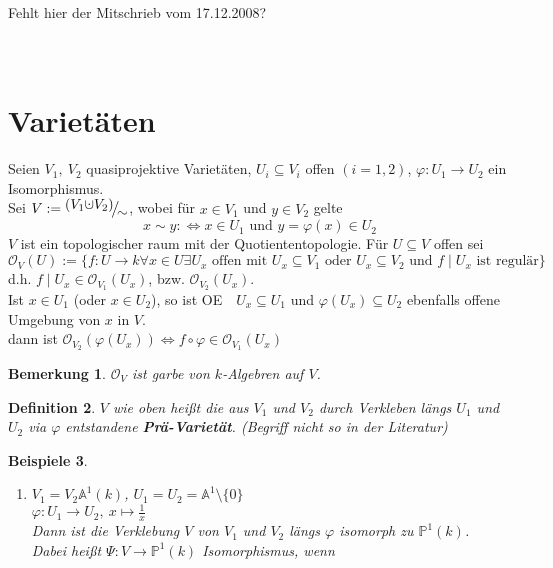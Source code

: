 \documentclass[a4paper,12pt]{report}
\theoremstyle{break}
\newtheorem{Def}{Definition}[section]
\newtheorem{Bem}[Def]{Bemerkung}
\newtheorem{Bsp}[Def]{Beispiele}
\theoremstyle{nonumberbreak}
\theoremstyle{nonumberplain}
\newcommand{\emp}[1]{\textbf{\emph{#1}}}
\newcommand{\begriff}[1]{{\index{#1}}\emp{#1}}
\newcommand{\cupdot}{\ensuremath{\mathaccent\cdot\cup}}
\newcommand{\FakRaum}[2]{
  \raisebox{0.7ex}{\ensuremath{#1}}
  \ensuremath{\mkern-3mu}\big/\ensuremath{\mkern-3mu}
  \raisebox{-0.6ex}{\ensuremath{#2}}}
\renewcommand{\OE}{O\!\!E}
\begin{document}
\\
\\
\\
\\
\Large{Fehlt hier der Mitschrieb vom 17.12.2008?}
\\
\\
\\
\section{Varietäten}

Seien $V_1,~V_2$ quasiprojektive Varietäten, $U_i\subseteq V_i$ offen $(i=1,2)$, $\varphi: U_1 \rightarrow U_2$ ein Isomorphismus.\\
Sei $V:=\FakRaum{(V_1\cupdot V_2)}{\sim}$, wobei für $x\in V_1$ und $y\in V_2$ gelte 
$$x\sim y :\Leftrightarrow x\in U_1 \text{ und } y=\varphi(x)\in U_2$$
$V$ ist ein topologischer raum mit der Quotiententopologie.
Für $U\subseteq V$ offen sei
$$\mathcal{O}_V(U):=\{f: U\rightarrow k \forall x\in U \exists U_x \text{ offen mit } U_x\subseteq V_1 \text{ oder } U_x\subseteq V_2 \text{ und } f\mid U_x \text{ ist regulär}\}$$
d.h. $f\mid U_x\in\mathcal{O}_{V_1}(U_x)$, bzw. $\mathcal{O}_{V_2}(U_x)$.\\
Ist $x\in U_1$ (oder $x\in U_2$), so ist \OE~~$U_x\subseteq U_1$ und $\varphi(U_x)\subseteq U_2$ ebenfalls offene Umgebung von $x$ in $V$.\\
dann ist $\mathcal{O}_{V_2}(\varphi(U_x))\Leftrightarrow f\circ\varphi\in\mathcal{O}_{V_1}(U_x)$
\begin{Bem}
\label{bem:13.1}
$\mathcal{O}_V$ ist garbe von $k$-Algebren auf $V$.
\end{Bem}

\begin{Def}
\label{def:13.2}
$V$ wie oben heißt die aus $V_1$ und $V_2$ durch Verkleben längs $U_1$ und $U_2$ via $\varphi$ entstandene \begriff{Prä-Varietät}. (Begriff nicht so in der Literatur) 
\end{Def}

\begin{Bsp}
\begin{enumerate}
\item $V_1=V_2\mathbb{A}^1(k)$, $U_1=U_2=\mathbb{A}^1\setminus\{0\}$\\
$\varphi:U_1\rightarrow U_2,~x\mapsto\frac{1}{x}$\\
Dann ist die Verklebung $V$ von $V_1$ und $V_2$ längs $\varphi$ isomorph zu $\mathbb{P}^1(k)$.\\
Dabei heißt $\Psi:V\rightarrow\mathbb{P}^1(k)$ Isomorphismus, wenn 
\end{enumerate}
\end{Bsp}
\end{document}

